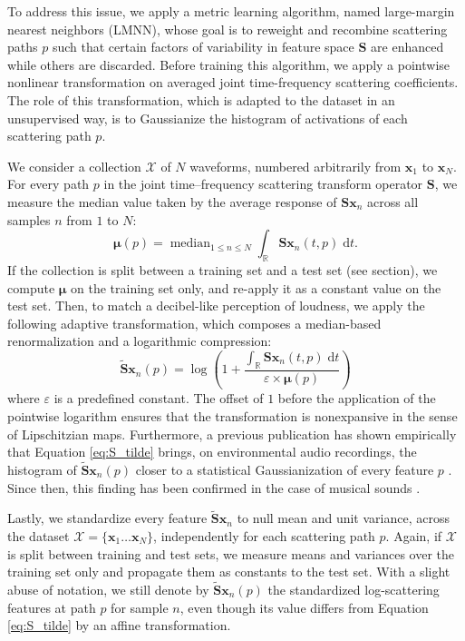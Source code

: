 \documentclass{bmcart}
\DeclareMathOperator*{\median}{median}
\newcommand{\lnameref}[1]{%
\bgroup
\let\nmu\MakeLowercase
\nameref{#1}\egroup}
\newcommand{\nmu}{}
\begin{document}
To address this issue, we apply a metric learning algorithm, named large-margin nearest neighbors (LMNN), whose goal is to reweight and recombine scattering paths $p$ such that certain factors of variability in feature space $\mathbf{S}$ are enhanced while others are discarded.
Before training this algorithm, we apply a pointwise nonlinear transformation on averaged joint time-frequency scattering coefficients. The role of this transformation, which is adapted to the dataset in an unsupervised way, is to Gaussianize the histogram of activations of each scattering path $p$.

We consider a collection $\mathcal{X}$ of $N$ waveforms, numbered arbitrarily from $\boldsymbol{x}_1$ to $\boldsymbol{x}_N$. For every path $p$ in the joint time--frequency scattering transform operator $\mathbf{S}$, we measure the median value taken by the average response of $\mathbf{S}\boldsymbol{x}_n$ across all samples $n$ from $1$ to $N$:
\begin{equation}
\boldsymbol{\mu}(p) =
\median_{1\leq n \leq N}
\int_{\mathbb{R}} \mathbf{S}\boldsymbol{x}_n(t, p) \;\mathrm{d}t.
\end{equation}
If the collection is split between a training set and a test set (see \lnameref{sec:discussion} section), we compute $\boldsymbol{\mu}$ on the training set only, and re-apply it as a constant value on the test set.
Then, to match a decibel-like perception of loudness, we apply the following adaptive transformation, which composes a median-based renormalization and a logarithmic compression:
\begin{equation}
\mathbf{\widetilde{S}}\boldsymbol{x}_n (p) =
\log \left(
1 +
\dfrac{
\int_\mathbb{R} \mathbf{S}\boldsymbol{x}_n (t, p) \;\mathrm{d}t
}{\varepsilon \times \boldsymbol{\mu}(p)}
\right)
\label{eq:S_tilde}
\end{equation}
where $\varepsilon$ is a predefined constant.
The offset of $1$ before the application of the pointwise logarithm ensures that the transformation is nonexpansive in the sense of Lipschitzian maps.
Furthermore, a previous publication has shown empirically that Equation \ref{eq:S_tilde} brings, on environmental audio recordings, the histogram of $\mathbf{\widetilde{S}}\boldsymbol{x}_n (p)$ closer to a statistical Gaussianization of every feature $p$ \cite{lostanlen2018jasmp}.
Since then, this finding has been confirmed in the case of musical sounds \cite{lostanlen2018extended}.

Lastly, we standardize every feature $\mathbf{\widetilde{S}}\boldsymbol{x}_n$ to null mean and unit variance, across the dataset $\mathcal{X} = \{\boldsymbol{x}_1 \ldots \boldsymbol{x}_N\}$, independently for each scattering path $p$.
Again, if $\mathcal{X}$ is split between training and test sets, we measure means and variances over the training set only and propagate them as constants to the test set.
With a slight abuse of notation, we still denote by $\mathbf{\widetilde{S}}\boldsymbol{x}_n (p)$ the standardized log-scattering features at path $p$ for sample $n$, even though its value differs from Equation \ref{eq:S_tilde} by an affine transformation.
\end{document}
